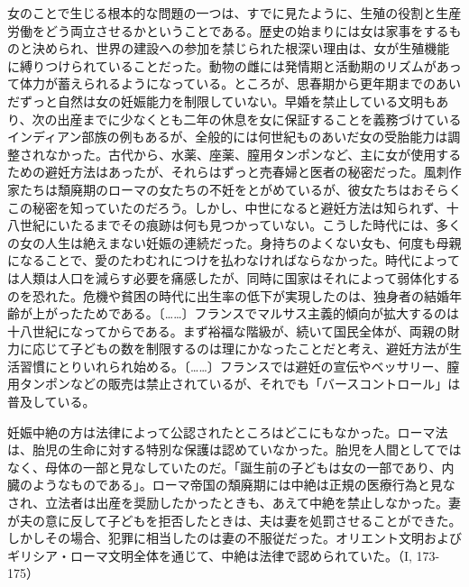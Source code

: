女のことで生じる根本的な問題の一つは、すでに見たように、生殖の役割と生産労働をどう両立させるかということである。歴史の始まりには女は家事をするものと決められ、世界の建設への参加を禁じられた根深い理由は、女が生殖機能に縛りつけられていることだった。動物の雌には発情期と活動期のリズムがあって体力が蓄えられるようになっている。ところが、思春期から更年期までのあいだずっと自然は女の妊娠能力を制限していない。早婚を禁止している文明もあり、次の出産までに少なくとも二年の休息を女に保証することを義務づけているインディアン部族の例もあるが、全般的には何世紀ものあいだ女の受胎能力は調整されなかった。古代から、水薬、座薬、膣用タンポンなど、主に女が使用するための避妊方法はあったが、それらはずっと売春婦と医者の秘密だった。風刺作家たちは頽廃期のローマの女たちの不妊をとがめているが、彼女たちはおそらくこの秘密を知っていたのだろう。しかし、中世になると避妊方法は知られず、十八世紀にいたるまでその痕跡は何も見つかっていない。こうした時代には、多くの女の人生は絶えまない妊娠の連続だった。身持ちのよくない女も、何度も母親になることで、愛のたわむれにつけを払わなければならなかった。時代によっては人類は人口を減らす必要を痛感したが、同時に国家はそれによって弱体化するのを恐れた。危機や貧困の時代に出生率の低下が実現したのは、独身者の結婚年齢が上がったためである。〔……〕フランスでマルサス主義的傾向が拡大するのは十八世紀になってからである。まず裕福な階級が、続いて国民全体が、両親の財力に応じて子どもの数を制限するのは理にかなったことだと考え、避妊方法が生活習慣にとりいれられ始める。〔……〕フランスでは避妊の宣伝やベッサリー、膣用タンポンなどの販売は禁止されているが、それでも「バースコントロール」は普及している。

妊娠中絶の方は法律によって公認されたところはどこにもなかった。ローマ法は、胎児の生命に対する特別な保護は認めていなかった。胎児を人間としてではなく、母体の一部と見なしていたのだ。「誕生前の子どもは女の一部であり、内臓のようなものである」。ローマ帝国の頽廃期には中絶は正規の医療行為と見なされ、立法者は出産を奨励したかったときも、あえて中絶を禁止しなかった。妻が夫の意に反して子どもを拒否したときは、夫は妻を処罰させることができた。しかしその場合、犯罪に相当したのは妻の不服従だった。オリエント文明およびギリシア・ローマ文明全体を通じて、中絶は法律で認められていた。（I, 173-175）

